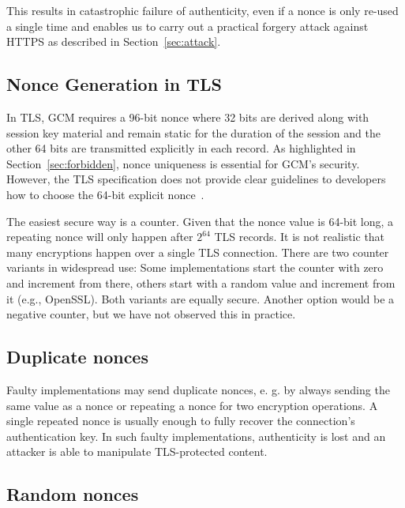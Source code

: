 \documentclass[10pt, a4paper]{article}
\begin{document}
This results in catastrophic failure of authenticity, even if a nonce is only re-used a single time and enables us to carry out a practical forgery attack against HTTPS as described in Section~\ref{sec:attack}.

\subsection{Nonce Generation in TLS}

In TLS, GCM requires a 96-bit nonce where 32 bits are derived along with session key material and remain static for the duration of the session and the other 64 bits are transmitted explicitly in each record.
As highlighted in Section~\ref{sec:forbidden}, nonce uniqueness is essential for GCM's security. However, the TLS specification does not provide clear guidelines to developers how to choose the 64-bit explicit nonce~\cite{langley2014}.

The easiest secure way is a counter. Given that the nonce value is 64-bit long, a repeating nonce will only happen after $2^{64}$ TLS records. It is not realistic
that many encryptions happen over a single TLS connection. There are two counter variants in widespread use: Some implementations start the counter with zero
and increment from there, others start with a random value and increment from it (e.g., OpenSSL). Both
variants are equally secure.
Another option would be a negative counter, but we have not observed this in practice.

\subsection{Duplicate nonces}

Faulty implementations may send duplicate nonces, e. g. by always sending the same value as a nonce or repeating
a nonce for two encryption operations. A single repeated nonce is usually enough to fully recover the
connection's authentication key. In such faulty implementations,
authenticity is lost and an attacker is able to manipulate TLS-protected content.

\subsection{Random nonces}
\end{document}
